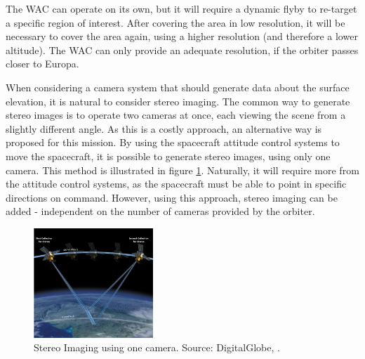 The WAC can operate on its own, but it will require a dynamic flyby to re-target a specific region of interest. After covering the area in low resolution, it will be necessary to cover the area again, using a higher resolution (and therefore a lower altitude). The WAC can only provide an adequate resolution, if the orbiter passes closer to Europa. 

When considering a camera system that should generate data about the surface elevation, it is natural to consider stereo imaging. The common way to generate stereo images is to operate two cameras at once, each viewing the scene from a slightly different angle. As this is a costly approach, an alternative way is proposed for this mission. By using the spacecraft attitude control systems to move the spacecraft, it is possible to generate stereo images, using only one camera. This method is illustrated in figure \ref{fig:stereoimg}. Naturally, it will require more from the attitude control systems, as the spacecraft must be able to point in specific directions on command. However, using this approach, stereo imaging can be added - independent on the number of cameras provided by the orbiter.

\begin{figure}[htb]
\centering
\includegraphics[width=0.4\textwidth]{figures/Orbiter/Stereo_Satellite.png}
\caption{Stereo Imaging using one camera. Source: DigitalGlobe, \cite{satimgcorp2015}.}
\label{fig:stereoimg}
\end{figure}

